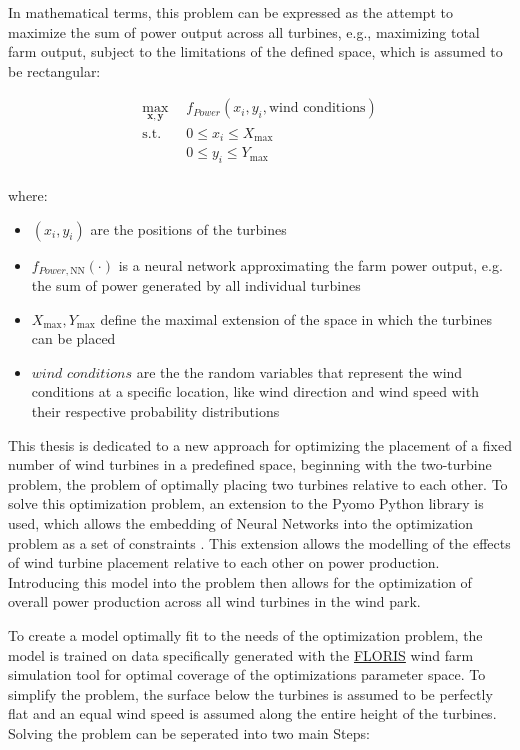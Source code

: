 \documentclass[preprint,12pt]{elsarticle}
\begin{document}
In mathematical terms, this problem can be expressed as the attempt to maximize the sum of power output across all turbines, e.g., maximizing total farm output, subject to the limitations of the defined space, which is assumed to be rectangular: 

\begin{align}
	\max_{\mathbf{x}, \mathbf{y}} & f_{Power}(x_i, y_i, \text{wind conditions}) \\
	\text{s.t.} \quad 
	&  0 \leq x_i \leq X_{\max} \\
	&  0 \leq y_i \leq Y_{\max} \\
\end{align}

where:
\begin{itemize}
	\item \( (x_i,  y_i) \) are the positions of the turbines
	\item \( f_{Power, \text{NN}}(\cdot)\) is a neural network approximating the farm power output, e.g. the sum of power generated by all individual turbines
	\item \(  X_{\max}, Y_{\max} \) define the maximal extension of the space in which the turbines can be placed
	\item \(\textit{wind conditions}\) are the the random variables that represent the wind conditions at a specific location, like wind direction and wind speed with their respective probability distributions 
\end{itemize}


This thesis is dedicated to a new approach for optimizing the placement of a fixed number of wind turbines in a predefined space, beginning with the two-turbine problem, the problem of optimally placing two turbines relative to each other. To solve this optimization problem, an extension to the Pyomo Python library is used, which allows the embedding of Neural Networks into the optimization problem as a set of constraints \cite{ALCANTARA2023120895}. This extension allows the modelling of the effects of wind turbine placement relative to each other on power production. Introducing this model into the problem then allows for the optimization of overall power production across all wind turbines in the wind park.

To create a model optimally fit to the needs of the optimization problem, the model is trained on data specifically generated with the \href{https://www.nrel.gov/wind/floris.html}{FLORIS} \cite{nrel_floris} wind farm simulation tool  for optimal coverage of the optimizations parameter space. To simplify the problem, the surface below the turbines is assumed to be perfectly flat and an equal wind speed is assumed along the entire height of the turbines. Solving the problem can be seperated into two main Steps:
\end{document}
